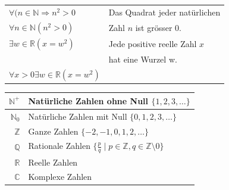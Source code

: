 \documentclass[a4paper]{article}
\begin{document}
\begin{multicols}{2}
	\begin{fmerke}[Quantoren]
	\begin{tabular}{ll}
		$\forall (n \in \mathbb{N} \Rightarrow n^2 > 0$ & Das Quadrat jeder natürlichen \\
		$\forall n \in \mathbb{N} (n^2 >0)$ & Zahl $n$ ist grösser 0.\\ \hline
		$\exists w \in \mathbb{R}(x = w^2)$ & Jede positive reelle Zahl $x$ \\
		& hat eine Wurzel w. \\ \hline
		$\forall x > 0 \exists w \in \mathbb{R}(x = w^2)$
	\end{tabular}
	\end{fmerke}

	\begin{fdef}
	\begin{tabular}{r|l}
		$\mathbb{N}^+$ & Natürliche Zahlen ohne Null $\{ 1,2,3,\dots \}$ \\\hline
		$\mathbb{N}_0$ & Natürliche Zahlen mit Null $\{ 0,1,2,3,\dots \}$ \\\hline
		$\mathbb{Z}$ & Ganze Zahlen $\{ -2,-1,0,1,2,\dots \}$ \\\hline
		$\mathbb{Q}$ & Rationale Zahlen $\{ \frac{p}{q} \mid p \in \mathbb{Z}, q \in \mathbb{Z} \setminus 0 \}$ \\\hline
		$\mathbb{R}$ & Reelle Zahlen \\\hline
		$\mathbb{C}$ & Komplexe Zahlen
	\end{tabular}
	\end{fdef}
	\end{multicols}
\end{document}
